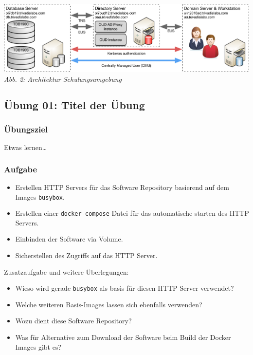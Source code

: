 \includegraphics{examples/images/LabEnvironment.png} \emph{Abb. 2:
Architektur Schulungsumgebung}

\hypertarget{uxfcbung-01-titel-der-uxfcbung}{%
\subsection{Übung 01: Titel der
Übung}\label{uxfcbung-01-titel-der-uxfcbung}}

\hypertarget{uxfcbungsziel}{%
\subsubsection{Übungsziel}\label{uxfcbungsziel}}

Etwas lernen\ldots{}

\hypertarget{aufgabe}{%
\subsubsection{Aufgabe}\label{aufgabe}}

\begin{itemize}
\tightlist
\item
  Erstellen HTTP Servers für das Software Repository basierend auf dem
  Images \passthrough{\lstinline!busybox!}.
\item
  Erstellen einer \passthrough{\lstinline!docker-compose!} Datei für das
  automatische starten des HTTP Servers.
\item
  Einbinden der Software via Volume.
\item
  Sicherstellen des Zugriffs auf das HTTP Server.
\end{itemize}

Zusatzaufgabe und weitere Überlegungen:

\begin{itemize}
\tightlist
\item
  Wieso wird gerade \passthrough{\lstinline!busybox!} als basis für
  diesen HTTP Server verwendet?
\item
  Welche weiteren Basis-Images lassen sich ebenfalls verwenden?
\item
  Wozu dient diese Software Repository?
\item
  Was für Alternative zum Download der Software beim Build der Docker
  Images gibt es?
\end{itemize}

